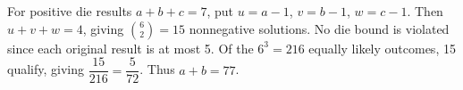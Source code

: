 For positive die results $a+b+c=7$, put $u=a-1$, $v=b-1$, $w=c-1$. Then $u+v+w=4$, giving $\binom62=15$ nonnegative solutions. No die bound is violated since each original result is at most 5. Of the $6^3=216$ equally likely outcomes, 15 qualify, giving $\dfrac{15}{216}=\dfrac{5}{72}$. Thus $\boxed{a+b=77}$.
